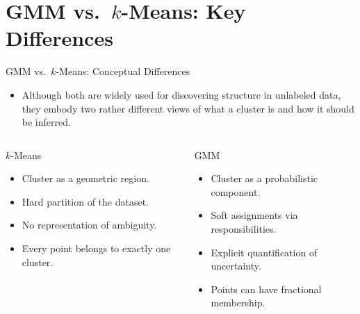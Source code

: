 \section{GMM vs.\ $k$-Means: Key Differences}

\begin{frame}{GMM vs.\ $k$-Means: Conceptual Differences}
  \begin{itemize}
    \item Although both are widely used for discovering structure in unlabeled data, they
          embody two rather different views of what a cluster is and how it should be inferred.
  \end{itemize}
  \begin{columns}[t]
      \begin{block}{$k$-Means}
        \begin{itemize}
          \item Cluster as a \alert{geometric region}.
          \item \alert{Hard partition} of the dataset.
          \item No representation of ambiguity.
          \item Every point belongs to exactly one cluster.
        \end{itemize}
      \end{block}
      \begin{block}{GMM}
        \begin{itemize}
          \item Cluster as a \alert{probabilistic component}.
          \item \alert{Soft assignments} via responsibilities.
          \item Explicit quantification of uncertainty.
          \item Points can have fractional membership.
        \end{itemize}
      \end{block}
  \end{columns}
\end{frame}

